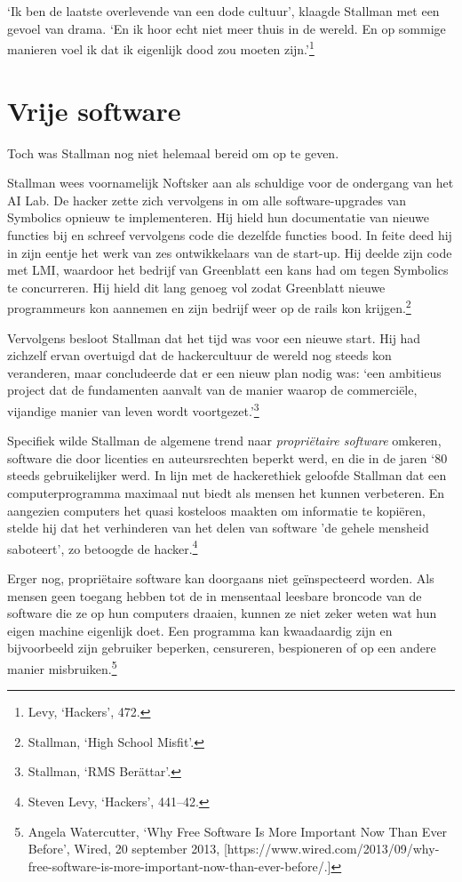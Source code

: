 \documentclass[
  a5paper,
  smalldemyvopaper,11pt,twoside,onecolumn,openright,extrafontsizes]{memoir}
\begin{document}
`Ik ben de laatste overlevende van een dode cultuur', klaagde Stallman
met een gevoel van drama. `En ik hoor echt niet meer thuis in de wereld.
En op sommige manieren voel ik dat ik eigenlijk dood zou moeten
zijn.'\footnote{\hspace{0pt}Levy, `Hackers', 472.}

\section{Vrije software}\label{vrije-software}

Toch was Stallman nog niet helemaal bereid om op te geven.

Stallman wees voornamelijk Noftsker aan als schuldige voor de ondergang
van het AI Lab. De hacker zette zich vervolgens in om alle
software-upgrades van Symbolics opnieuw te implementeren. Hij hield hun
documentatie van nieuwe functies bij en schreef vervolgens code die
dezelfde functies bood. In feite deed hij in zijn eentje het werk van
zes ontwikkelaars van de start-up. Hij deelde zijn code met LMI,
waardoor het bedrijf van Greenblatt een kans had om tegen Symbolics te
concurreren. Hij hield dit lang genoeg vol zodat Greenblatt nieuwe
programmeurs kon aannemen en zijn bedrijf weer op de rails kon
krijgen.\footnote{\hspace{0pt}Stallman, `High School Misfit'.}

Vervolgens besloot Stallman dat het tijd was voor een nieuwe start. Hij
had zichzelf ervan overtuigd dat de hackercultuur de wereld nog steeds
kon veranderen, maar concludeerde dat er een nieuw plan nodig was: `een
ambitieus project dat de fundamenten aanvalt van de manier waarop de
commerciële, vijandige manier van leven wordt voortgezet.'\footnote{\hspace{0pt}Stallman,
  `RMS Berättar'.}

Specifiek wilde Stallman de algemene trend naar \emph{propriëtaire
software} omkeren, software die door licenties en auteursrechten beperkt
werd, en die in de jaren `80 steeds gebruikelijker werd. In lijn met de
hackerethiek geloofde Stallman dat een computerprogramma maximaal nut
biedt als mensen het kunnen verbeteren. En aangezien computers het quasi
kosteloos maakten om informatie te kopiëren, stelde hij dat het
verhinderen van het delen van software 'de gehele mensheid saboteert',
zo betoogde de hacker.\footnote{\hspace{0pt}Steven Levy, `Hackers',
  441--42.}

Erger nog, propriëtaire software kan doorgaans niet geïnspecteerd
worden. Als mensen geen toegang hebben tot de in mensentaal leesbare
broncode van de software die ze op hun computers draaien, kunnen ze niet
zeker weten wat hun eigen machine eigenlijk doet. Een programma kan
kwaadaardig zijn en bijvoorbeeld zijn gebruiker beperken, censureren,
bespioneren of op een andere manier misbruiken.\footnote{\hspace{0pt}Angela
  Watercutter, `Why Free Software Is More Important Now Than Ever
  Before', Wired, 20 september 2013,
  {[}https://www.wired.com/2013/09/why-free-software-is-more-important-now-than-ever-before/.{]}}
\end{document}
